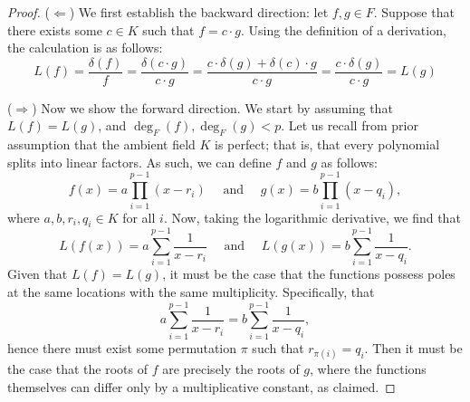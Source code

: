 \documentclass{article}
\theoremstyle{definition}
\newcommand{\6}{\mathbf}
\newcommand{\7}{\mathcal}
\begin{document}
\begin{proof}
    ($\Leftarrow$) We first establish the backward direction: let $f,g \in F$. Suppose that there exists some $c \in K$ such that $f = c \cdot g$. 
    Using the definition of a derivation, the calculation is as follows:
    $$L(f) = \frac{\delta(f)}{f} = \frac{\delta(c \cdot g)}{c \cdot g} = \frac{c \cdot \delta(g) + \delta(c) \cdot g}{c \cdot g} = \frac{c \cdot \delta(g)}{c \cdot g} = L(g)$$
    





    ($\Rightarrow$) Now we show the forward direction. We start by assuming that $L(f) = L(g)$, and $\deg_F(f), \deg_F(g) < p$.
    Let us recall from prior assumption that the ambient field $K$ is perfect; that is, that every polynomial splits into linear factors. As such, we can define $f$ and $g$ as follows:
    $$f(x) = a \prod_{i = 1}^{p - 1} (x - r_i) \quad \text{ and } \quad g(x) = b \prod_{i = 1}^{p - 1} (x - q_i),$$
    where $a,b,r_i,q_i \in K$ for all $i$. Now, taking the logarithmic derivative, we find that
    $$L(f(x)) = a \sum_{i = 1}^{p-1}\frac{1}{x - r_i} \quad \text{ and } \quad L(g(x)) = b \sum_{i = 1}^{p-1} \frac{1}{x - q_i}.$$
    Given that $L(f) = L(g)$, it must be the case that the functions possess poles at the same locations with the same multiplicity. Specifically, that 
    $$a \sum_{i = 1}^{p-1}\frac{1}{x - r_i} = b \sum_{i = 1}^{p-1} \frac{1}{x - q_i},$$
    hence there  must exist some permutation $\pi$ such that $r_{\pi(i)} = q_i$.
    Then it must be the case that the roots of $f$ are precisely the roots of $g$, where the functions themselves can differ only by a multiplicative constant, as claimed. 


\end{proof}
\end{document}
